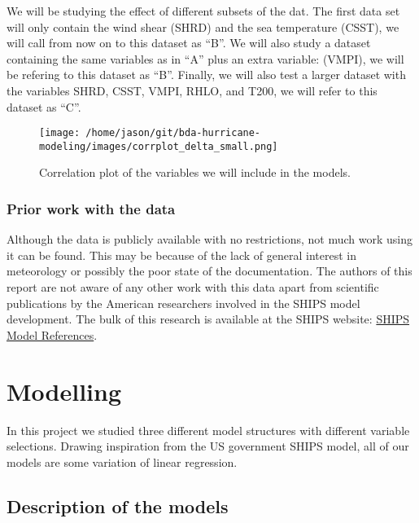 \documentclass[
]{article}
\begin{document}
We will be studying the effect of different subsets of the dat. The
first data set will only contain the wind shear (SHRD) and the sea
temperature (CSST), we will call from now on to this dataset as ``B''.
We will also study a dataset containing the same variables as in ``A''
plus an extra variable: (VMPI), we will be refering to this dataset as
``B''. Finally, we will also test a larger dataset with the variables
SHRD, CSST, VMPI, RHLO, and T200, we will refer to this dataset as
``C''.

\begin{figure}
\centering
\texttt{[image: /home/jason/git/bda-hurricane-modeling/images/corrplot\_delta\_small.png]}
\caption{Correlation plot of the variables we will include in the
models.}
\end{figure}

\hypertarget{prior-work-with-the-data}{%
\subsubsection{Prior work with the
data}\label{prior-work-with-the-data}}

Although the data is publicly available with no restrictions, not much
work using it can be found. This may be because of the lack of general
interest in meteorology or possibly the poor state of the documentation.
The authors of this report are not aware of any other work with this
data apart from scientific publications by the American researchers
involved in the SHIPS model development. The bulk of this research is
available at the SHIPS website:
\href{http://rammb.cira.colostate.edu/research/tropical_cyclones/ships/references.asp}{SHIPS
Model References}.

\newpage

\hypertarget{modelling}{%
\section{Modelling}\label{modelling}}

In this project we studied three different model structures with
different variable selections. Drawing inspiration from the US
government SHIPS model, all of our models are some variation of linear
regression.

\hypertarget{description-of-the-models}{%
\subsection{Description of the models}\label{description-of-the-models}}
\end{document}
